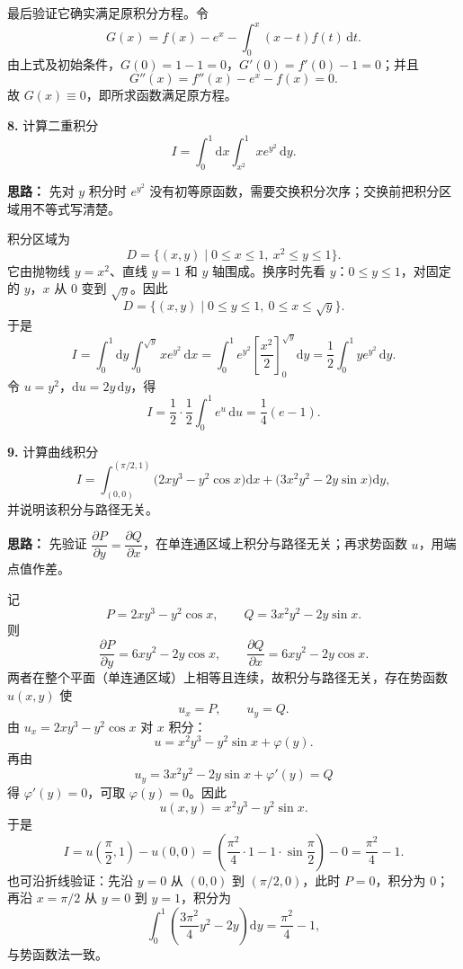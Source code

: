 最后验证它确实满足原积分方程。令
\[
G(x)=f(x)-e^x-\int_0^x(x-t)f(t)\,\mathrm{d}t.
\]
由上式及初始条件，$G(0)=1-1=0$，$G'(0)=f'(0)-1=0$；并且
\[
G''(x)=f''(x)-e^x-f(x)=0.
\]
故 $G(x)\equiv0$，即所求函数满足原方程。
\else \answerarea[10] \fi%

\textbf{8.} 计算二重积分
\[
I=\int_0^1\mathrm{d}x\int_{x^2}^{1}x e^{y^2}\,\mathrm{d}y.
\]

\ifshowsolutions%

\textbf{思路：} 先对 $y$ 积分时 $e^{y^2}$ 没有初等原函数，需要交换积分次序；交换前把积分区域用不等式写清楚。

积分区域为
\[
D=\{(x,y)\mid 0\le x\le 1,\ x^2\le y\le 1\}.
\]
它由抛物线 $y=x^2$、直线 $y=1$ 和 $y$ 轴围成。换序时先看 $y$：$0\le y\le 1$，对固定的 $y$，$x$ 从 $0$ 变到 $\sqrt y$。因此
\[
D=\{(x,y)\mid 0\le y\le 1,\ 0\le x\le\sqrt y\}.
\]
于是
\[
I=\int_0^1\mathrm{d}y\int_0^{\sqrt y}x e^{y^2}\,\mathrm{d}x
=\int_0^1 e^{y^2}\left[\frac{x^2}{2}\right]_0^{\sqrt y}\mathrm{d}y
=\frac12\int_0^1 y e^{y^2}\,\mathrm{d}y.
\]
令 $u=y^2$，$\mathrm{d}u=2y\,\mathrm{d}y$，得
\[
I=\frac12\cdot\frac12\int_0^1 e^u\,\mathrm{d}u
=\frac14(e-1).
\]
\else \answerarea[8] \fi%

\textbf{9.} 计算曲线积分
\[
I=\int_{(0,0)}^{(\pi/2,1)}
\bigl(2xy^3-y^2\cos x\bigr)\mathrm{d}x
+\bigl(3x^2y^2-2y\sin x\bigr)\mathrm{d}y,
\]
并说明该积分与路径无关。

\ifshowsolutions%

\textbf{思路：} 先验证 $\dfrac{\partial P}{\partial y}=\dfrac{\partial Q}{\partial x}$，在单连通区域上积分与路径无关；再求势函数 $u$，用端点值作差。

记
\[
P=2xy^3-y^2\cos x,\qquad Q=3x^2y^2-2y\sin x.
\]
则
\[
\frac{\partial P}{\partial y}=6xy^2-2y\cos x,\qquad
\frac{\partial Q}{\partial x}=6xy^2-2y\cos x.
\]
两者在整个平面（单连通区域）上相等且连续，故积分与路径无关，存在势函数 $u(x,y)$ 使
\[
u_x=P,\qquad u_y=Q.
\]
由 $u_x=2xy^3-y^2\cos x$ 对 $x$ 积分：
\[
u=x^2y^3-y^2\sin x+\varphi(y).
\]
再由
\[
u_y=3x^2y^2-2y\sin x+\varphi'(y)=Q
\]
得 $\varphi'(y)=0$，可取 $\varphi(y)=0$。因此
\[
u(x,y)=x^2y^3-y^2\sin x.
\]
于是
\[
I=u\left(\frac{\pi}{2},1\right)-u(0,0)
=\left(\frac{\pi^2}{4}\cdot1-1\cdot\sin\frac{\pi}{2}\right)-0
=\frac{\pi^2}{4}-1.
\]
也可沿折线验证：先沿 $y=0$ 从 $(0,0)$ 到 $(\pi/2,0)$，此时 $P=0$，积分为 $0$；再沿 $x=\pi/2$ 从 $y=0$ 到 $y=1$，积分为
\[
\int_0^1\left(\frac{3\pi^2}{4}y^2-2y\right)\mathrm{d}y
=\frac{\pi^2}{4}-1,
\]
与势函数法一致。
\else \answerarea[10] \fi%

